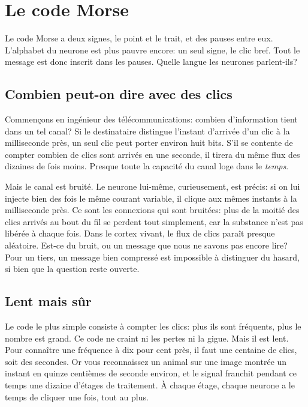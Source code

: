\chapter{Le code Morse}

Le code Morse a deux signes, le point et le trait, et des pauses entre eux. L'alphabet du neurone est plus pauvre encore: un seul signe, le clic bref. Tout le message est donc inscrit dans les pauses. Quelle langue les neurones parlent-ils?

\section*{Combien peut-on dire avec des clics}

Commençons en ingénieur des télécommunications: combien d'information tient dans un tel canal? Si le destinataire distingue l'instant d'arrivée d'un clic à la milliseconde près, un seul clic peut porter environ huit bits. S'il se contente de compter combien de clics sont arrivés en une seconde, il tirera du même flux des dizaines de fois moins. Presque toute la capacité du canal loge dans le \emph{temps}.


Mais le canal est bruité. Le neurone lui-même, curieusement, est précis: si on lui injecte bien des fois le même courant variable, il clique aux mêmes instants à la milliseconde près. Ce sont les connexions qui sont bruitées: plus de la moitié des clics arrivés au bout du fil se perdent tout simplement, car la substance n'est pas libérée à chaque fois. Dans le cortex vivant, le flux de clics paraît presque aléatoire. Est-ce du bruit, ou un message que nous ne savons pas encore lire? Pour un tiers, un message bien compressé est impossible à distinguer du hasard, si bien que la question reste ouverte.

\section*{Lent mais sûr}

Le code le plus simple consiste à compter les clics: plus ils sont fréquents, plus le nombre est grand. Ce code ne craint ni les pertes ni la gigue. Mais il est lent. Pour connaître une fréquence à dix pour cent près, il faut une centaine de clics, soit des secondes. Or vous reconnaissez un animal sur une image montrée un instant en quinze centièmes de seconde environ, et le signal franchit pendant ce temps une dizaine d'étages de traitement. À chaque étage, chaque neurone a le temps de cliquer une fois, tout au plus.

